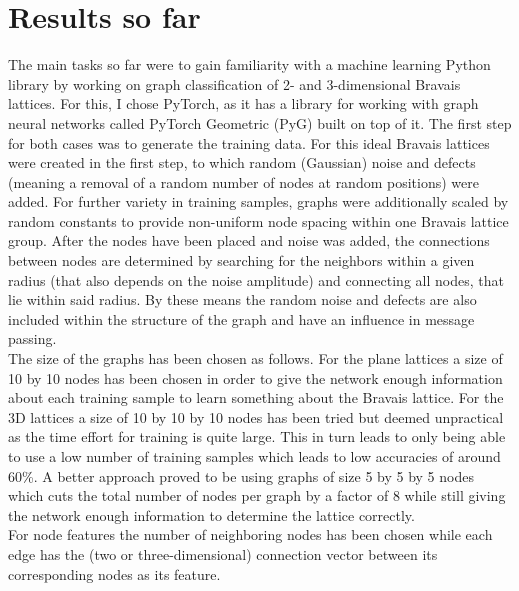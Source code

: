 \documentclass[11pt,a4paper]{article}
\begin{document}
\section{Results so far}
\label{sec:Results so far}
The main tasks so far were to gain familiarity with a machine learning Python library by working on graph classification of 2- and 3-dimensional Bravais lattices. 
For this, I chose PyTorch, as it has a library for working with graph neural networks called PyTorch Geometric (PyG) built on top of it. 
The first step for both cases was to generate the training data. 
For this ideal Bravais lattices were created in the first step, to which random (Gaussian) noise and defects (meaning a removal of a random number of nodes at random positions) were added. 
For further variety in training samples, graphs were additionally scaled by random constants to provide non-uniform node spacing within one Bravais lattice group. 
After the nodes have been placed and noise was added, the connections between nodes are determined by searching for the neighbors within a given radius (that also depends on the noise amplitude) and connecting all nodes, that lie within said radius. 
By these means the random noise and defects are also included within the structure of the graph and have an influence in message passing. \\
The size of the graphs has been chosen as follows. 
For the plane lattices a size of 10 by 10 nodes has been chosen in order to give the network enough information about each training sample to learn something about the Bravais lattice. 
For the 3D lattices a size of 10 by 10 by 10 nodes has been tried but deemed unpractical as the time effort for training is quite large. 
This in turn leads to only being able to use a low number of training samples which leads to low accuracies of around 60\%. 
A better approach proved to be using graphs of size 5 by 5 by 5 nodes which cuts the total number of nodes per graph by a factor of 8 while still giving the network enough information to determine the lattice correctly. \\
For node features the number of neighboring nodes has been chosen while each edge has the (two or three-dimensional) connection vector between its corresponding nodes as its feature. 
\end{document}
